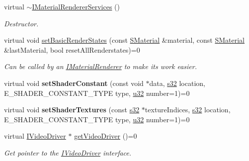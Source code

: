 \begin{DoxyCompactItemize}
\item 
virtual \hyperlink{classirr_1_1video_1_1IMaterialRendererServices_abbab02366d5303f106d14278bf88aff3}{$\sim$\+I\+Material\+Renderer\+Services} ()\hypertarget{classirr_1_1video_1_1IMaterialRendererServices_abbab02366d5303f106d14278bf88aff3}{}\label{classirr_1_1video_1_1IMaterialRendererServices_abbab02366d5303f106d14278bf88aff3}

\begin{DoxyCompactList}\small\item\em Destructor. \end{DoxyCompactList}\item 
virtual void \hyperlink{classirr_1_1video_1_1IMaterialRendererServices_ab000e24fe3f65fb63b007a37895df3f2}{set\+Basic\+Render\+States} (const \hyperlink{classirr_1_1video_1_1SMaterial}{S\+Material} \&material, const \hyperlink{classirr_1_1video_1_1SMaterial}{S\+Material} \&last\+Material, bool reset\+All\+Renderstates)=0
\begin{DoxyCompactList}\small\item\em Can be called by an \hyperlink{classirr_1_1video_1_1IMaterialRenderer}{I\+Material\+Renderer} to make its work easier. \end{DoxyCompactList}\item 
virtual void {\bfseries set\+Shader\+Constant} (const void $\ast$data, \hyperlink{namespaceirr_ac66849b7a6ed16e30ebede579f9b47c6}{s32} location, E\+\_\+\+S\+H\+A\+D\+E\+R\+\_\+\+C\+O\+N\+S\+T\+A\+N\+T\+\_\+\+T\+Y\+PE type, \hyperlink{namespaceirr_a0416a53257075833e7002efd0a18e804}{u32} number=1)=0\hypertarget{classirr_1_1video_1_1IMaterialRendererServices_a9daba6be508488249813391f3916b977}{}\label{classirr_1_1video_1_1IMaterialRendererServices_a9daba6be508488249813391f3916b977}

\item 
virtual void {\bfseries set\+Shader\+Textures} (const \hyperlink{namespaceirr_ac66849b7a6ed16e30ebede579f9b47c6}{s32} $\ast$texture\+Indices, \hyperlink{namespaceirr_ac66849b7a6ed16e30ebede579f9b47c6}{s32} location, E\+\_\+\+S\+H\+A\+D\+E\+R\+\_\+\+C\+O\+N\+S\+T\+A\+N\+T\+\_\+\+T\+Y\+PE type, \hyperlink{namespaceirr_a0416a53257075833e7002efd0a18e804}{u32} number=1)=0\hypertarget{classirr_1_1video_1_1IMaterialRendererServices_a2afca0de6c076417afd0058446ccfeb3}{}\label{classirr_1_1video_1_1IMaterialRendererServices_a2afca0de6c076417afd0058446ccfeb3}

\item 
virtual \hyperlink{classirr_1_1video_1_1IVideoDriver}{I\+Video\+Driver} $\ast$ \hyperlink{classirr_1_1video_1_1IMaterialRendererServices_a2a80795887e43cb743eb5ee82604d4cf}{get\+Video\+Driver} ()=0
\begin{DoxyCompactList}\small\item\em Get pointer to the \hyperlink{classirr_1_1video_1_1IVideoDriver}{I\+Video\+Driver} interface. \end{DoxyCompactList}\end{DoxyCompactItemize}


